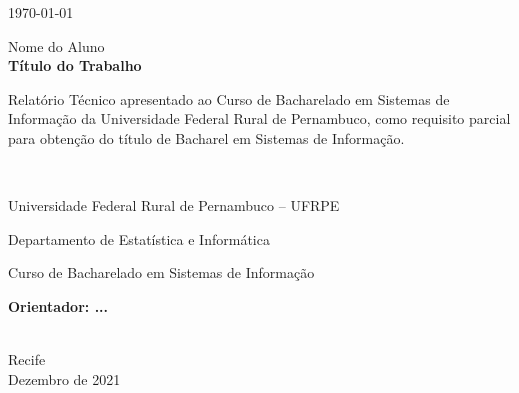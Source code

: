 \begin{titlepage}
\begin{center}
{\large \today}
\end{center}

%

{\center
{\large Nome do Aluno}\\[3cm]
{\Large \bf Título do Trabalho}\\[2.0cm]


{\raggedleft
\begin{minipage}[t]{8.3cm}
\setlength{\baselineskip}{0.25in}
Relatório Técnico apresentado ao Curso de Bacharelado em Sistemas de Informação da Universidade Federal Rural de Pernambuco, como requisito parcial para obtenção do título de Bacharel em Sistemas de Informação.
\end{minipage}\\[2cm]}

\begin{center}
	Universidade Federal Rural de Pernambuco -- UFRPE
  	\par
  	Departamento de Estatística e Informática
    \par
  	Curso de Bacharelado em Sistemas de Informação
\end{center}

\vspace{3cm}
{\large \bf{Orientador:} ...}}\\[2.0cm]

\vspace{2cm}
{\center Recife \\[2mm]
Dezembro  de 2021 \\}






\end{titlepage}